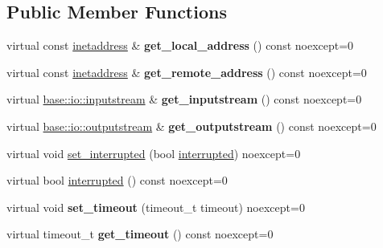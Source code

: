 \subsection*{Public Member Functions}
\begin{DoxyCompactItemize}
\item 
\mbox{\label{structdevfix_1_1net_1_1socket_a570b728ca81a3d47ca7733ff21063318}} 
virtual const \hyperlink{structdevfix_1_1net_1_1inetaddress}{inetaddress} \& {\bfseries get\+\_\+local\+\_\+address} () const noexcept=0
\item 
\mbox{\label{structdevfix_1_1net_1_1socket_afb69dcc8da66eb15a927d031f50a4ba2}} 
virtual const \hyperlink{structdevfix_1_1net_1_1inetaddress}{inetaddress} \& {\bfseries get\+\_\+remote\+\_\+address} () const noexcept=0
\item 
\mbox{\label{structdevfix_1_1net_1_1socket_a3a00115497ccb83e8497a7e33be06b03}} 
virtual \hyperlink{structdevfix_1_1base_1_1io_1_1inputstream}{base\+::io\+::inputstream} \& {\bfseries get\+\_\+inputstream} () const noexcept=0
\item 
\mbox{\label{structdevfix_1_1net_1_1socket_ac0320fa786f14778a3a1e2796d9dce57}} 
virtual \hyperlink{structdevfix_1_1base_1_1io_1_1outputstream}{base\+::io\+::outputstream} \& {\bfseries get\+\_\+outputstream} () const noexcept=0
\item 
virtual void \hyperlink{structdevfix_1_1net_1_1socket_a3fa8d7dcd44e7740b29ad6674005eb5d}{set\+\_\+interrupted} (bool \hyperlink{structdevfix_1_1net_1_1socket_a7cfe151f1124d46fb19fad0c374c9352}{interrupted}) noexcept=0
\item 
virtual bool \hyperlink{structdevfix_1_1net_1_1socket_a7cfe151f1124d46fb19fad0c374c9352}{interrupted} () const noexcept=0
\item 
\mbox{\label{structdevfix_1_1net_1_1socket_ae1cf3b2c4f5d39225d6585c387f967d5}} 
virtual void {\bfseries set\+\_\+timeout} (timeout\+\_\+t timeout) noexcept=0
\item 
\mbox{\label{structdevfix_1_1net_1_1socket_afac86b6ad30a758ce590e7a144764967}} 
virtual timeout\+\_\+t {\bfseries get\+\_\+timeout} () const noexcept=0
\end{DoxyCompactItemize}
